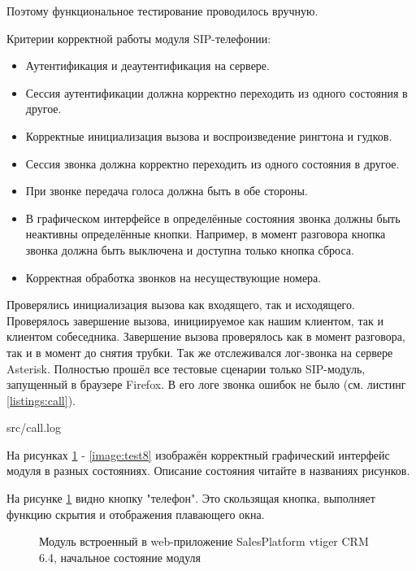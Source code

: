 Поэтому функциональное тестирование проводилось вручную.

Критерии корректной работы модуля SIP-телефонии:
\begin{itemize}
\item Аутентификация и деаутентификация на сервере.
\item Сессия аутентификации должна корректно переходить из одного состояния в другое.
\item Корректные инициализация вызова и воспроизведение рингтона и гудков.
\item Сессия звонка должна корректно переходить из одного состояния в другое.
\item При звонке передача голоса должна быть в обе стороны.
\item В графическом интерфейсе в определённые состояния звонка должны быть неактивны определённые кнопки. Например, в момент разговора кнопка звонка должна быть выключена и доступна только кнопка сброса.
\item Корректная обработка звонков на несуществующие номера.
\end{itemize}

Проверялись инициализация вызова как входящего, так и исходящего. Проверялось завершение вызова, инициируемое как нашим клиентом, так и клиентом собеседника. Завершение вызова проверялось как в момент разговора, так и в момент до снятия трубки. Так же отслеживался лог-звонка на сервере Asterisk. Полностью прошёл все тестовые сценарии только SIP-модуль, запущенный в браузере Firefox. В его логе звонка ошибок не было (см. листинг \ref{listings:call}).


{src/call.log}

На рисунках \ref{image:test1} - \ref{image:test8} изображён корректный графический интерфейс модуля в разных состояниях. Описание состояния читайте в названиях рисунков.

На рисунке \ref{image:test1} видно кнопку "телефон". Это скользящая кнопка, выполняет функцию скрытия и отображения плавающего окна.

\begin{figure}[h!]
\caption{Модуль встроенный в web-приложение SalesPlatform vtiger CRM 6.4, начальное состояние модуля}
\label{image:test1}
\end{figure}

